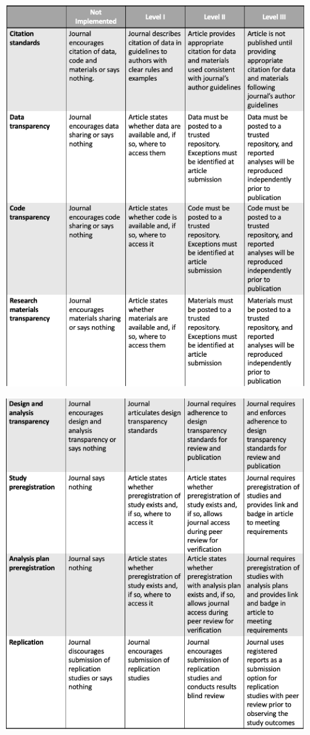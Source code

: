 \documentclass[12pt,twoside]{reedthesis}
\begin{document}
\includegraphics[width=1\linewidth]{figure/top-1}

\includegraphics[width=1\linewidth]{figure/top-2}
\end{document}
